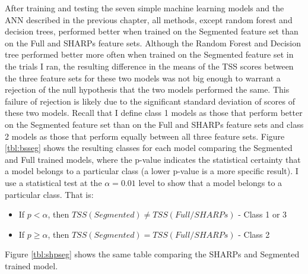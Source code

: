 \documentclass[defaultstyle,11pt]{thesis}
\begin{document}
After training and testing the seven simple machine learning models and the ANN described in the previous chapter, all methods, except random forest and decision trees, performed better when trained on the Segmented feature set than on the Full and SHARPs feature sets. Although the Random Forest and Decision tree performed better more often when trained on the Segmented feature set in the trials I ran, the resulting difference in the means of the TSS scores between the three feature sets for these two models was not big enough to warrant a rejection of the null hypothesis that the two models performed the same. This failure of rejection is likely due to the significant standard deviation of scores of these two models. Recall that I define class 1 models as those that perform better on the Segmented feature set than on the Full and SHARPs feature sets and class 2 models as those that perform equally between all three feature sets. Figure \ref{tbl:bsseg} shows the resulting classes for each model comparing the Segmented and Full trained models, where the p-value indicates the statistical certainty that a model belongs to a particular class (a lower p-value is a more specific result). I use a statistical test at the $\alpha = 0.01$ level to show that a model belongs to a particular class. That is:

\begin{itemize}
    \item If $p < \alpha$, then $TSS(Segmented) \neq TSS(Full/SHARPs)$ - Class 1 or 3
    \item If $p \geq \alpha$, then $TSS(Segmented) = TSS(Full/SHARPs)$ - Class 2 
\end{itemize}

\noindent Figure \ref{tbl:shpseg} shows the same table comparing the SHARPs and Segmented trained model.
\end{document}
